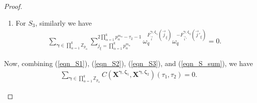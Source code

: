 \documentclass[10pt,a4paper]{amsart}
\theoremstyle{plain}
\begin{document}
\begin{proof}
\begin{mycases}
\begin{enumerate}
				\item For $S_3$, similarly we have
				\begin{equation}\label{eqn_S3}
					\begin{split}
						\sum_{\bm{\gamma} \in \prod_{\alpha=1}^{k} \mathbb{Z}_{p_\alpha}}^{} \sum_{j_{\xi}= \prod_{\alpha=1}^{k} p_\alpha^{m_\alpha}}^{2 \prod_{\alpha=1}^{k} p_\alpha^{m_\alpha} -\tau_2-1} \omega_q^{ 	F_{ \vec{i}}^{\bm{\gamma}, \bm{\zeta}_1} (\vec{j}_{\xi}) } \omega_q^{ 	-F_{ \vec{i}'}^{\bm{\gamma}, \bm{\zeta}_2} (\vec{j}'_{\xi}) }=0.
					\end{split}
				\end{equation}
			\end{enumerate}
			Now, combining (\ref{eqn_S1}), (\ref{eqn_S2}), (\ref{eqn_S3}), and (\ref{eqn_S_sum}), we have
			\begin{equation}
				\begin{split}
					\sum_{\bm{\gamma} \in \prod_{\alpha=1}^{k} \mathbb{Z}_{p_\alpha}}^{} C\left( \mathbf{X}^{\bm{\gamma},\bm{\zeta}_1}, \mathbf{X}^{\bm{\gamma},\bm{\zeta}_2} \right) (\tau_1, \tau_2)=0.
				\end{split}
			\end{equation}
			

\end{mycases}
\end{proof}
\end{document}
